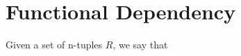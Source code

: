\chapter{Functional Dependency}

\begin{definition}
Given a set of n-tuples $R$, we say that 
\end{definition}
